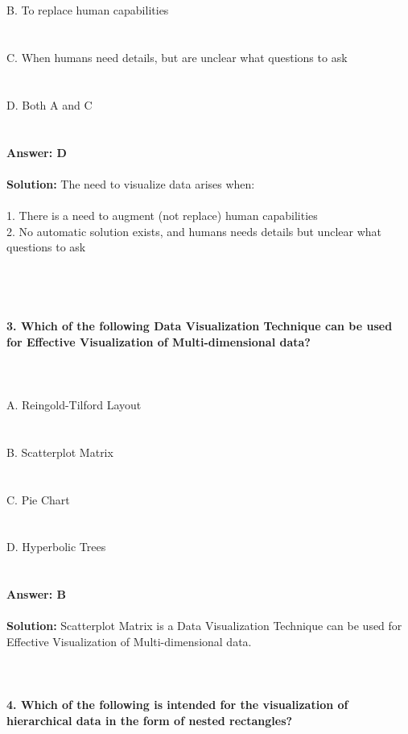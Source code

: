 \documentclass[prl,twocolumn,showpacs,preprintnumbers,superscriptaddress]{revtex4}
\theoremstyle{plain}
\theoremstyle{definition}
\begin{document}
\begin{widetext}
\\
\\
B. To replace human capabilities\\
\\
\\
C. When humans need details, but are unclear what questions to ask\\
\\
\\
D. Both A and C
\\
\\
\\
\textbf{Answer: D}
\\
\\
\textbf{Solution:} The need to visualize data arises when:
\\
\\
1. There is a need to augment (not replace) human capabilities
\\
2. No automatic solution exists, and humans needs details but unclear what questions to ask
\\
\\
\\
\\
\\
\textbf{3. Which of the following Data Visualization Technique can be used for Effective Visualization of Multi-dimensional data?}
\\
\\
\\
\\
\noindent A. Reingold-Tilford Layout\\
\\
\\
B. Scatterplot Matrix\\
\\
\\
C. Pie Chart\\
\\
\\
D. Hyperbolic Trees
\\
\\
\\
\textbf{Answer: B}
\\
\\
\textbf{Solution:}
Scatterplot Matrix is a Data Visualization Technique can be used for Effective Visualization of Multi-dimensional data.
\\
\\
\\
\\
\textbf{4. Which of the following is intended for the visualization of hierarchical data in the form of nested rectangles?}  

\end{widetext}
\end{document}
